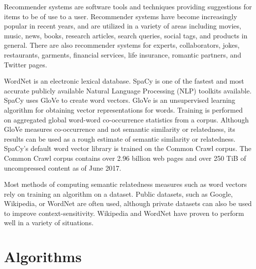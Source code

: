 \documentclass{article}
\begin{document}
Recommender systems are software tools and techniques providing suggestions for items to be of use to a user\cite{ricci2011introduction}. Recommender systems have become increasingly popular in recent years, and are utilized in a variety of areas including movies, music, news, books, research articles, search queries, social tags, and products in general. There are also recommender systems for experts, collaborators, jokes, restaurants, garments, financial services, life insurance, romantic partners, and Twitter pages. %

WordNet is an electronic lexical database\cite{kilgarriff2000wordnet}. %
SpaCy is one of the fastest and most accurate publicly available Natural Language Processing (NLP) toolkits available\cite{choi2015depends}.
SpaCy uses GloVe to create word vectors. GloVe is an unsupervised learning algorithm for obtaining vector representations for words. Training is performed on aggregated global word-word co-occurrence statistics from a corpus\cite{pennington2014glove}. Although GloVe measures co-occurrence and not semantic similarity or relatedness, its results can be used as a rough estimate of semantic similarity or relatedness\cite{levy2015improving}. SpaCy's default word vector library is trained on the Common Crawl corpus. The Common Crawl corpus contains over 2.96 billion web pages and over 250 TiB of uncompressed content as of June 2017\cite{nagel2017commoncrawl}.

Most methods of computing semantic relatedness measures such as word vectors rely on training an algorithm on a dataset. Public datasets, such as Google, Wikipedia, or WordNet are often used, although private datasets can also be used to improve context-sensitivity. Wikipedia and WordNet have proven to perform well in a variety of situations\cite{strube2006wikirelate}. %

\section{Algorithms}
\end{document}
